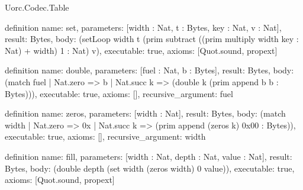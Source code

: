 \begin{lexlean}{Uorc.Codec.Table}
\begin{semanticmodule}
definition{
  name: set,
  parameters: [width : Nat, t : Bytes, key : Nat, v : Nat],
  result: Bytes,
  body: (setLoop width t (prim subtract ((prim multiply width key : Nat) + width) 1 : Nat) v),
  executable: true,
  axioms: [Quot.sound, propext]
}

definition{
  name: double,
  parameters: [fuel : Nat, b : Bytes],
  result: Bytes,
  body: (match fuel
    | Nat.zero => b
    | Nat.succ k => (double k (prim append b b : Bytes))),
  executable: true,
  axioms: [],
  recursive_argument: fuel
}

definition{
  name: zeros,
  parameters: [width : Nat],
  result: Bytes,
  body: (match width
    | Nat.zero => 0x
    | Nat.succ k => (prim append (zeros k) 0x00 : Bytes)),
  executable: true,
  axioms: [],
  recursive_argument: width
}

definition{
  name: fill,
  parameters: [width : Nat, depth : Nat, value : Nat],
  result: Bytes,
  body: (double depth (set width (zeros width) 0 value)),
  executable: true,
  axioms: [Quot.sound, propext]
}
\end{semanticmodule}
\end{lexlean}
